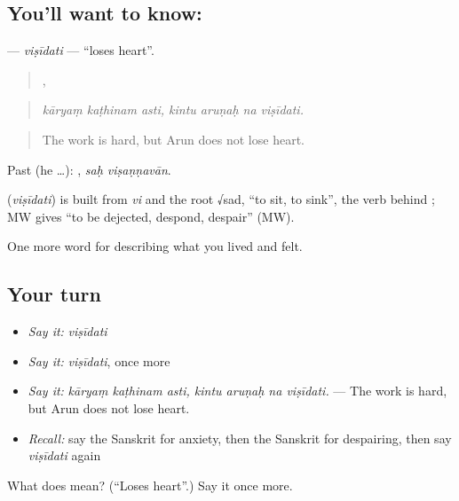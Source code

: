 \subsection*{You'll want to know: }
\textbf{} — \emph{viṣīdati} — \textquotedblleft{}loses heart\textquotedblright{}.

\begin{quote}
  ,    
\end{quote}

\begin{quote}
\emph{kāryaṃ kaṭhinam asti, kintu aruṇaḥ na viṣīdati.}
\end{quote}

\begin{quote}
The work is hard, but Arun does not lose heart.
\end{quote}

Past (he …):  , \emph{saḥ viṣaṇṇavān}.

\begin{cousinweb}
\textbf{} (\emph{viṣīdati}) is built from \emph{vi} and the root √sad, \textquotedblleft{}to sit, to sink\textquotedblright{}, the verb behind \textbf{}; MW gives \textquotedblleft{}to be dejected, despond, despair\textquotedblright{} (MW).
\end{cousinweb}

\begin{grammarlens}[title={What you've built}]
One more word for describing what you lived and felt.
\end{grammarlens}

\subsection*{Your turn}
\begin{itemize}
\raggedright
  \item \emph{Say it:} \emph{viṣīdati}
  \item \emph{Say it:} \emph{viṣīdati}, once more
  \item \emph{Say it:} \emph{kāryaṃ kaṭhinam asti, kintu aruṇaḥ na viṣīdati.} — The work is hard, but Arun does not lose heart.
  \item \emph{Recall:} say the Sanskrit for anxiety, then the Sanskrit for despairing, then say \emph{viṣīdati} again
\end{itemize}

\begin{tcolorbox}[breakable,colback=teal!4,colframe=teal!35!black,title={Before you move on}]
What does  mean? (\textquotedblleft{}Loses heart\textquotedblright{}.) Say it once more.
\end{tcolorbox}
